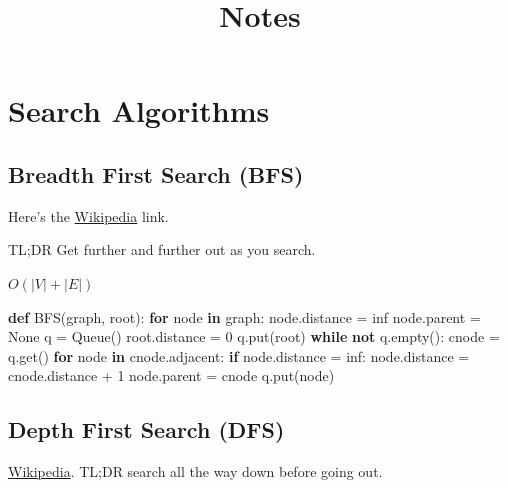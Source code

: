 \documentclass[11pt]{article}
\title{Notes}
\newenvironment{Shaded}{}{}
\newcommand{\KeywordTok}[1]{\textcolor[rgb]{0.00,0.44,0.13}{\textbf{{#1}}}}
\newcommand{\DecValTok}[1]{\textcolor[rgb]{0.25,0.63,0.44}{{#1}}}
\newcommand{\NormalTok}[1]{{#1}}
\newcommand{\VariableTok}[1]{\textcolor[rgb]{0.10,0.09,0.49}{{#1}}}
\newcommand{\ControlFlowTok}[1]{\textcolor[rgb]{0.00,0.44,0.13}{\textbf{{#1}}}}
\newcommand{\OperatorTok}[1]{\textcolor[rgb]{0.40,0.40,0.40}{{#1}}}
\begin{document}
    
    
    \maketitle
    
    

    
    \section{Search Algorithms}\label{search-algorithms}

    \subsection{Breadth First Search (BFS)}\label{breadth-first-search-bfs}

Here's the
\href{https://en.wikipedia.org/wiki/Breadth-first_search}{Wikipedia}
link.

TL;DR Get further and further out as you search.

\(O(|V| + |E|)\)

\begin{Shaded}
\begin{Highlighting}[]
\KeywordTok{def} \NormalTok{BFS(graph, root):}
  \ControlFlowTok{for} \NormalTok{node }\KeywordTok{in} \NormalTok{graph:}
    \NormalTok{node.distance }\OperatorTok{=} \NormalTok{inf}
    \NormalTok{node.parent }\OperatorTok{=} \VariableTok{None}
  \NormalTok{q }\OperatorTok{=} \NormalTok{Queue()}
  \NormalTok{root.distance }\OperatorTok{=} \DecValTok{0}
  \NormalTok{q.put(root)}
  \ControlFlowTok{while} \KeywordTok{not} \NormalTok{q.empty():}
    \NormalTok{cnode }\OperatorTok{=} \NormalTok{q.get()}
    \ControlFlowTok{for} \NormalTok{node }\KeywordTok{in} \NormalTok{cnode.adjacent:}
      \ControlFlowTok{if} \NormalTok{node.distance }\OperatorTok{=} \NormalTok{inf:}
        \NormalTok{node.distance }\OperatorTok{=} \NormalTok{cnode.distance }\OperatorTok{+} \DecValTok{1}
        \NormalTok{node.parent }\OperatorTok{=} \NormalTok{cnode}
        \NormalTok{q.put(node)}
\end{Highlighting}
\end{Shaded}

    \subsection{Depth First Search (DFS)}\label{depth-first-search-dfs}

\href{https://en.wikipedia.org/wiki/Depth-first_search}{Wikipedia}.
TL;DR search all the way down before going out.
\end{document}
